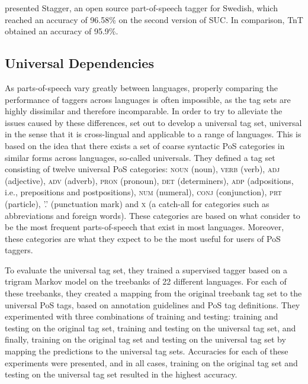 \documentclass[a4paper,12pt,english]{book}
\begin{document}
 presented Stagger, an open source part-of-speech tagger for
Swedish, which reached an accuracy of 96.58\% on the second version of SUC. In
comparison, TnT \cite{Bra:00} obtained an accuracy of 95.9\%.

\subsection{Universal Dependencies}
\label{ssec:ud}
As parts-of-speech vary greatly between languages, properly comparing the
performance of taggers across languages is often impossible, as the tag sets
are highly dissimilar and therefore incomparable. In order to try to alleviate
the issues caused by these differences,  set out to
develop a universal tag set, universal in the sense that it is cross-lingual
and applicable to a range of languages. This is based on the idea that there
exists a set of coarse syntactic PoS categories in similar forms across
languages, so-called universals. They defined a tag set consisting of twelve
universal PoS categories: \textsc{noun} (noun), \textsc{verb} (verb),
\textsc{adj} (adjective), \textsc{adv} (adverb), \textsc{pron} (pronoun),
\textsc{det} (determiners), \textsc{adp} (adpositions, i.e., prepositions and
postpositions), \textsc{num} (numeral), \textsc{conj} (conjunction),
\textsc{prt} (particle), '.' (punctuation mark) and \textsc{x} (a catch-all for
categories such as abbreviations and foreign words). These categories are based
on what  consider to be the most frequent parts-of-speech
that exist in most languages. Moreover, these categories are what they expect
to be the most useful for users of PoS taggers.

To evaluate the universal tag set, they trained a supervised tagger based on a
trigram Markov model \cite{Bra:00} on the treebanks of 22 different languages.
For each of these treebanks, they created a mapping from the original treebank
tag set to the universal PoS tags, based on annotation guidelines and PoS tag
definitions. They experimented with three combinations of training and testing:
training and testing on the original tag set, training and testing on the
universal tag set, and finally, training on the original tag set and testing on
the universal tag set by mapping the predictions to the universal tag sets.
Accuracies for each of these experiments were presented, and in all cases,
training on the original tag set and testing on the universal tag set resulted
in the highest accuracy.
\end{document}
